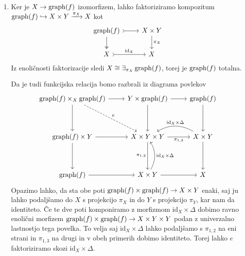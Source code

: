 \documentclass[../kategoricna_logika.tex]{subfiles}
\begin{document}
\begin{dokaz}
  \begin{enumerate}[label=(\roman*)]
  \item Ker je $X \to \operatorname{graph}(f)$ izomorfizem, lahko faktoriziramo
    kompozitum
    $\operatorname{graph}(f) \hookrightarrow X \times Y \xrightarrow{\pi_X} X$ kot
    \begin{equation*}
      \begin{tikzcd}
        \operatorname{graph}(f) \ar[d, two heads] \ar[r, tail]  & X \times Y \ar[d, "\pi_X"] \\
        X \ar[r, tail, "\mathrm{id}_X"] & X
      \end{tikzcd}
    \end{equation*}
    Iz enoličnosti faktorizacije sledi
    $X \cong \exists_{\pi_X}\operatorname{graph}(f)$, torej je $\operatorname{graph}(f)$ totalna.

    Da je tudi funkcijska relacija bomo razbrali iz diagrama povlekov
    \begin{equation*}
      \begin{tikzcd}[row sep=9ex]
        \graf(f) \times_X \graf(f) \ar[d] \ar[r] \ar[dr, dashed, "e"] &
        Y \times \graf(f) \ar[d] \ar[r] & \graf(f) \ar[d]\\
        \graf(f) \times Y \ar[d] \ar[r] & X \times Y \times Y \ar[d, "\pi_{1,2}"'] \ar[r, "\pi_{1,3}"'] &
        X \times Y \ar[d] \ar[l, bend right, " \mathrm{id}_X \times \Delta"'] \\
        \graf(f) \ar[r] & X \times Y \ar[u, bend right, " \mathrm{id}_X \times \Delta"'] \ar[r] & X
      \end{tikzcd}
    \end{equation*}
    Opazimo lahko, da sta obe poti $\operatorname{graph}(f) \times \operatorname{graph}(f) \to X \times Y$ enaki, saj ju lahko
    podaljšamo do $X$ s projekcijo $\pi_X$ in do $Y$ s projekcijo $\pi_Y$, kar nam da identiteto.
    Če te dve poti komponiramo z morfizmom $\mathrm{id}_X \times \Delta$ dobimo ravno enolični morfizem
    $\operatorname{graph}(f) \times \operatorname{graph}(f) \to X \times Y \times Y$ podan z univerzalno lastnostjo tega povelka.
    To velja saj $\mathrm{id}_X \times \Delta$ lahko podaljšamo s $\pi_{1,2}$ na eni strani in
    $\pi_{1,3}$ na drugi in v obeh primerih dobimo identiteto. Torej lahko $e$ faktoriziramo
    skozi $\mathrm{id}_X \times \Delta$.


\end{enumerate}
\end{dokaz}
\end{document}
